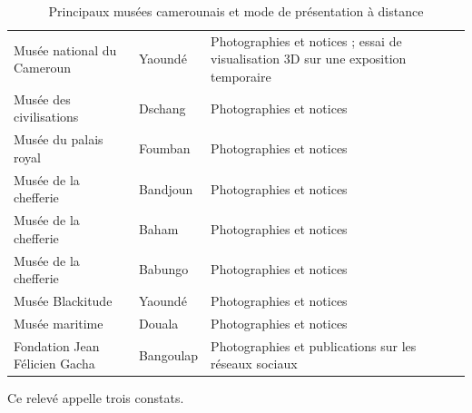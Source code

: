 \begin{table}[htbp]
\centering
\caption{Principaux musées camerounais et mode de présentation à distance}
\label{tab:museescmr}
\small
\begin{tabularx}{\textwidth}{|L{4.6cm}|L{2.6cm}|X|}
\hline
{}
 &  &  \\ \hline
Musée national du Cameroun & Yaoundé & Photographies et notices ; essai de visualisation 3D sur une exposition temporaire \\ \hline
Musée des civilisations & Dschang & Photographies et notices \\ \hline
Musée du palais royal & Foumban & Photographies et notices \\ \hline
Musée de la chefferie & Bandjoun & Photographies et notices \\ \hline
Musée de la chefferie & Baham & Photographies et notices \\ \hline
Musée de la chefferie & Babungo & Photographies et notices \\ \hline
Musée Blackitude & Yaoundé & Photographies et notices \\ \hline
Musée maritime & Douala & Photographies et notices \\ \hline
Fondation Jean Félicien Gacha & Bangoulap & Photographies et publications sur les réseaux sociaux \\ \hline
\end{tabularx}
\end{table}

Ce relevé appelle trois constats.

